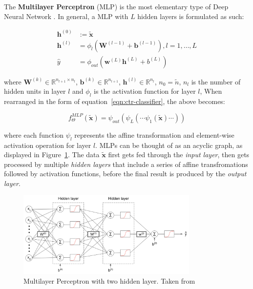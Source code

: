 \documentclass{mldsmsc}
\begin{document}
The \textbf{Multilayer Perceptron} (MLP) \label{ref:mlp} is the most elementary type of Deep Neural Network
\citep{RefWorks:webster2024week}. In general, a MLP with $L$ hidden layers is formulated as such:

\begin{align}
\label{eqn:mlp}
\mathbf{h}^{(0)} &:= \tilde{\mathbf{x}} \\
\mathbf{h}^{(l)} &= \phi_{l} \left( \mathbf{W}^{(l-1)} + \mathbf{b}^{(l-1)} \right), l = 1, \ldots, L \\
\hat{y} &= \phi_{out} \left( \mathbf{w}^{(L)} \mathbf{h}^{(L)} + b^{(L)} \right)
\end{align}

where $\mathbf{W}^{(k)} \in \mathbb{R}^{n_{l+1} \times n_l } $, $\mathbf{b}^{(k)} \in \mathbb{R}^{n_{l+1}}$,
$\mathbf{h}^{(l)} \in \mathbb{R}^{n_l}$, $n_0 = \tilde{n}$, $n_l$ is the number of hidden
units in layer $l$ and $\phi_{l}$ is the activation function for layer $l$, 
When rearranged in the form of equation~\ref{eqn:ctr-classifier}, the above becomes:

\begin{equation}
\label{eqn:mlp-2}
f_{\Theta}^{MLP}(\tilde{\mathbf{x}}) = \psi_{out} \left( \psi_{L} \left( \cdots \psi_{1} \left( 
    \tilde{\mathbf{x}} \right) \cdots \right) \right)
\end{equation}

where each function $\psi_{l}$ represents the affine transformation and element-wise activation
operation for layer $l$. MLPs can be thought of as an acyclic graph, as displayed in
Figure~\ref{fig:mlp}. The data $\tilde{\mathbf{x}}$ first gets fed through the
\emph{input layer}, then gets processed by multiple \emph{hidden layers} that include
a series of affine transfromations followed by activation functions, before the final
result is produced by the \emph{output layer}.

\begin{figure}[h]
    \centering
    \includegraphics[width=0.8\textwidth]{../figures/ann_two_hidden_layers.png}
    \caption{Multilayer Perceptron with two hidden layer. Taken from \citep{RefWorks:webster2024week}}
    \label{fig:mlp}
\end{figure}
\end{document}
